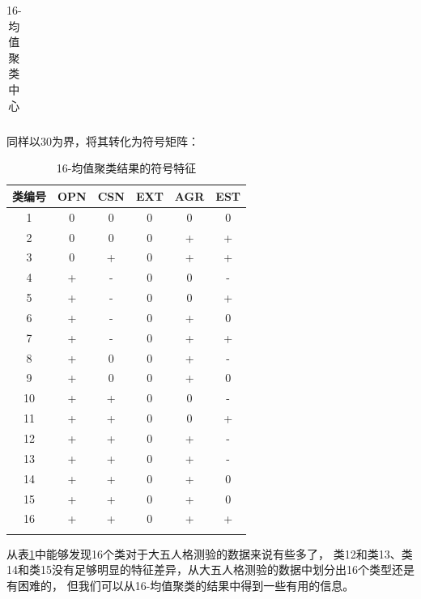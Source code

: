 \documentclass[UTF8]{ctexart}
\begin{document}
\begin{longtable}{c|c|c|c|c|c}
  \caption{16-均值聚类中心}
\end{longtable}
\noindent 同样以30为界，将其转化为符号矩阵：
\begin{longtable}{c|c|c|c|c|c}
  \hline
  类编号 & OPN & CSN & EXT & AGR & EST \\\hline
  1   & 0   & 0   & 0   & 0   & 0   \\
  2   & 0   & 0   & 0   & +   & +   \\
  3   & 0   & +   & 0   & +   & +   \\
  4   & +   & -   & 0   & 0   & -   \\
  5   & +   & -   & 0   & 0   & +   \\
  6   & +   & -   & 0   & +   & 0   \\
  7   & +   & -   & 0   & +   & +   \\
  8   & +   & 0   & 0   & +   & -   \\
  9   & +   & 0   & 0   & +   & 0   \\
  10  & +   & +   & 0   & 0   & -   \\
  11  & +   & +   & 0   & 0   & +   \\
  12  & +   & +   & 0   & +   & -   \\
  13  & +   & +   & 0   & +   & -   \\
  14  & +   & +   & 0   & +   & 0   \\
  15  & +   & +   & 0   & +   & 0   \\
  16  & +   & +   & 0   & +   & +   \\\hline
  \caption{16-均值聚类结果的符号特征}
  \label{symbol16}
\end{longtable}
从表\ref{symbol16}中能够发现16个类对于大五人格测验的数据来说有些多了，
类12和类13、类14和类15没有足够明显的特征差异，从大五人格测验的数据中划分出16个类型还是有困难的，
但我们可以从16-均值聚类的结果中得到一些有用的信息。\par
\end{document}
